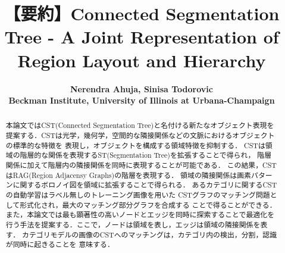\documentclass[twocolumn,a4j,fleqn]{jarticle}
\title{
  {\Large{\bf 【要約】Connected Segmentation Tree - A Joint Representation of Region Layout and Hierarchy }}
}
\author{\bf{\dag Nerendra Ahuja, \dag Sinisa Todorovic}\\
  {\large \dag Beckman Institute, University of Illinois at Urbana-Champaign}
}
\date{}
\begin{document}
\maketitle

\small{
\begin{abstract}
本論文ではCST(Connected Segmentation Tree)と名付ける新たなオブジェクト表現を
提案する．CSTは光学，幾何学，空間的な隣接関係などの文脈におけるオブジェクトの標準的な特徴を
表現し，オブジェクトを構成する領域特徴を抑制する．
CSTは領域の階層的な関係を表現するST(Segmentation Tree)を拡張することで得られ，
階層関係に加えて階層内の隣接関係を同時に表現することが可能である．
この結果，CSTはRAG(Region Adjacensy Graphs)の階層を表現する．
領域の隣接関係は画素パターンに関するボロノイ図を領域に拡張することで得られる．
あるカテゴリに関するCSTの自動学習はラベル無しのトレーニング画像を用いた
CSTグラフのマッチング問題として形式化され，最大のマッチング部分グラフを合成する
ことで得ることができる．
また，本論文では最も顕著性の高いノードとエッジを同時に探索することで最適化を
行う手法を提案する．ここで，ノードは領域を表し，エッジは領域の隣接関係を表す．
カテゴリモデルの画像のCSTへのマッチングは，カテゴリ内の検出，分割，認識が同時に起きることを
意味する．

\end{abstract}














%

%
}
\end{document}

